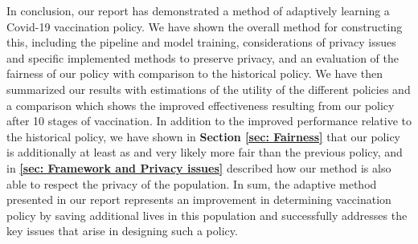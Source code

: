 \documentclass{article}
\begin{document}
In conclusion, our report has demonstrated a method of adaptively learning a Covid-19 vaccination policy. We have shown the overall method for constructing this, including the pipeline and model training, considerations of privacy issues and specific implemented methods to preserve privacy, and an evaluation of the fairness of our policy with comparison to the historical policy. We have then summarized our results with estimations of the utility of the different policies and a comparison which shows the improved effectiveness resulting from our policy after 10 stages of vaccination. In addition to the improved performance relative to the historical policy, we have shown in \textbf{Section \ref{sec: Fairness}} that our policy is additionally at least as and very likely more fair than the previous policy, and in \textbf{\ref{sec: Framework and Privacy issues}} described how our method is also able to respect the privacy of the population. In sum, the adaptive method presented in our report represents an improvement in determining vaccination policy by saving additional lives in this population and successfully addresses the key issues that arise in designing such a policy.

\printbibliography
\end{document}
